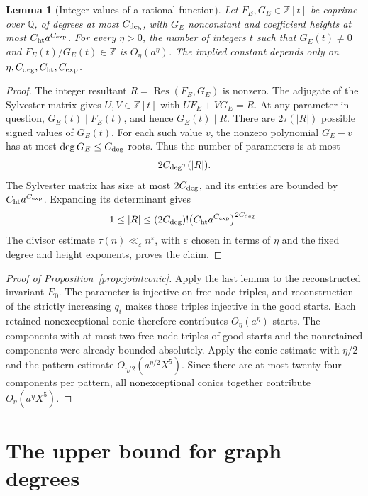 \documentclass[11pt]{article}
\newtheorem{lemma}[theorem]{Lemma}
\theoremstyle{definition}
\theoremstyle{remark}
\begin{document}
\begin{lemma}[Integer values of a rational function]\label{lem:jointconicdivisors}
Let $F_E,G_E\in\mathbb Z[t]$ be coprime over $\mathbb Q$, of degrees at most
$C_{\rm deg}$, with $G_E$ nonconstant and coefficient heights at most
$C_{\rm ht}a^{C_{\rm exp}}$. For every $\eta>0$, the number of integers $t$ such that
$G_E(t)\ne0$ and $F_E(t)/G_E(t)\in\mathbb Z$ is $O_\eta(a^\eta)$.
The implied constant depends only on $\eta,C_{\rm deg},C_{\rm ht},C_{\rm exp}$.
\end{lemma}
\begin{proof}
The integer resultant $R=\operatorname{Res}(F_E,G_E)$ is nonzero.
The adjugate of the Sylvester matrix gives $U,V\in\mathbb Z[t]$ with
$UF_E+VG_E=R$. At any parameter in question, $G_E(t)\mid F_E(t)$, and hence
$G_E(t)\mid R$. There are $2\tau(|R|)$ possible signed values of $G_E(t)$.
For each such value $v$, the nonzero polynomial $G_E-v$ has at most
$\deg G_E\le C_{\rm deg}$ roots. Thus the number of parameters is at most
\[
 2C_{\rm deg}\tau(|R|).
\]
The Sylvester matrix has size at most $2C_{\rm deg}$, and its entries are
bounded by $C_{\rm ht}a^{C_{\rm exp}}$. Expanding its determinant gives
\[
 1\le |R|\le(2C_{\rm deg})!\bigl(C_{\rm ht}a^{C_{\rm exp}}\bigr)^{2C_{\rm deg}}.
\]
The divisor estimate $\tau(n)\ll_\varepsilon n^\varepsilon$, with
$\varepsilon$ chosen in terms of $\eta$ and the fixed degree and height
exponents, proves the claim.
\end{proof}

\begin{proof}[Proof of Proposition~\ref{prop:jointconic}]
Apply the last lemma to the reconstructed invariant $E_0$. The
parameter is injective on free-node triples, and reconstruction
of the strictly increasing $q_i$ makes those triples injective in the
good starts. Each retained nonexceptional conic therefore
contributes $O_\eta(a^\eta)$ starts. The components with at most two
free-node triples of good starts and the nonretained components were already bounded
absolutely. Apply the conic estimate with $\eta/2$ and the pattern
estimate $O_{\eta/2}(a^{\eta/2}X^5)$. Since there are at most twenty-four
components per pattern, all nonexceptional conics together contribute
$O_\eta(a^\eta X^5)$.
\end{proof}

\section{The upper bound for graph degrees}\label{app:degree}
\end{document}
